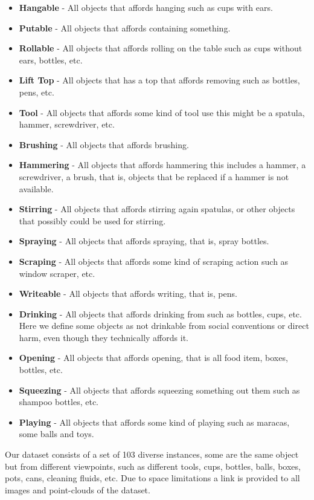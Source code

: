 \begin{itemize}
\tightlist
\item
  \textbf{Hangable} - All objects that affords hanging such as cups with
  ears.
\item
  \textbf{Putable} - All objects that affords containing something.
\item
  \textbf{Rollable} - All objects that affords rolling on the table such
  as cups without ears, bottles, etc.
\item
  \textbf{Lift Top} - All objects that has a top that affords removing
  such as bottles, pens, etc.
\item
  \textbf{Tool} - All objects that affords some kind of tool use this
  might be a spatula, hammer, screwdriver, etc.
\item
  \textbf{Brushing} - All objects that affords brushing.
\item
  \textbf{Hammering} - All objects that affords hammering this includes
  a hammer, a screwdriver, a brush, that is, objects that be replaced if
  a hammer is not available.
\item
  \textbf{Stirring} - All objects that affords stirring again spatulas,
  or other objects that possibly could be used for stirring.
\item
  \textbf{Spraying} - All objects that affords spraying, that is, spray
  bottles.
\item
  \textbf{Scraping} - All objects that affords some kind of scraping
  action such as window scraper, etc.
\item
  \textbf{Writeable} - All objects that affords writing, that is, pens.
\item
  \textbf{Drinking} - All objects that affords drinking from such as
  bottles, cups, etc. Here we define some objects as not drinkable from
  social conventions or direct harm, even though they technically
  affords it.
\item
  \textbf{Opening} - All objects that affords opening, that is all food
  item, boxes, bottles, etc.
\item
  \textbf{Squeezing} - All objects that affords squeezing something out
  them such as shampoo bottles, etc.
\item
  \textbf{Playing} - All objects that affords some kind of playing such
  as maracas, some balls and toys.
\end{itemize}

\normalsize

Our dataset consists of a set of 103 diverse instances, some are the
same object but from different viewpoints, such as different tools,
cups, bottles, balls, boxes, pots, cans, cleaning fluids, etc. Due to
space limitations a link is provided to all images and point-clouds of
the dataset.

